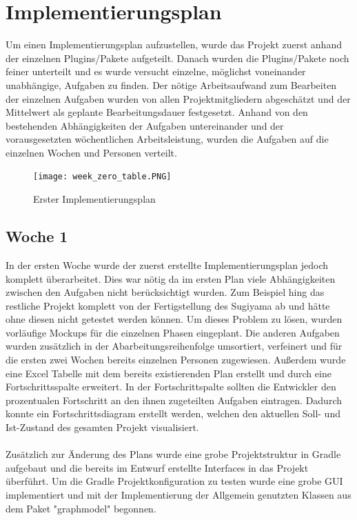 \chapter{Implementierungsplan}
\label{ch:implplan}
Um einen Implementierungsplan aufzustellen, wurde das Projekt zuerst anhand der einzelnen Plugins/Pakete aufgeteilt. Danach wurden die Plugins/Pakete noch feiner unterteilt und es wurde versucht einzelne, möglichst voneinander unabhängige, Aufgaben zu finden. Der nötige Arbeitsaufwand zum Bearbeiten der einzelnen Aufgaben wurden von allen Projektmitgliedern abgeschätzt und der Mittelwert als geplante Bearbeitungsdauer festgesetzt. Anhand von den bestehenden Abhängigkeiten der Aufgaben untereinander und der vorausgesetzten wöchentlichen Arbeitsleistung, wurden die Aufgaben auf die einzelnen Wochen und Personen verteilt. \\
\begin{figure}[!htbp]
	\centering
	\texttt{[image: week\_zero\_table.PNG]}
	\caption{Erster Implementierungsplan}
	\label{fig:week_zero_table}
\end{figure}
\newpage
\section{Woche 1}
In der ersten Woche wurde der zuerst erstellte Implementierungsplan jedoch komplett überarbeitet. Dies war nötig da im ersten Plan viele Abhängigkeiten zwischen den Aufgaben nicht berücksichtigt wurden. Zum Beispiel hing das restliche Projekt komplett von der Fertigstellung des Sugiyama ab und hätte ohne diesen nicht getestet werden können. Um dieses Problem zu lösen, wurden vorläufige Mockups für die einzelnen Phasen eingeplant. Die anderen Aufgaben wurden zusätzlich in der Abarbeitungsreihenfolge umsortiert, verfeinert und für die ersten zwei Wochen bereits einzelnen Personen zugewiesen. Außerdem wurde eine Excel Tabelle mit dem bereits existierenden Plan erstellt und durch eine Fortschrittsspalte erweitert. In der Fortschrittspalte sollten die Entwickler den prozentualen Fortschritt an den ihnen zugeteilten Aufgaben eintragen. Dadurch konnte ein Fortschrittsdiagram erstellt werden, welchen den aktuellen Soll- und Ist-Zustand des gesamten Projekt visualisiert.\\
\\
Zusätzlich zur Änderung des Plans wurde eine grobe Projektstruktur in Gradle aufgebaut und die bereits im Entwurf erstellte Interfaces in das Projekt überführt. Um die Gradle Projektkonfiguration zu testen wurde eine grobe GUI implementiert und mit der Implementierung der Allgemein genutzten Klassen aus dem Paket "graphmodel"  begonnen.

